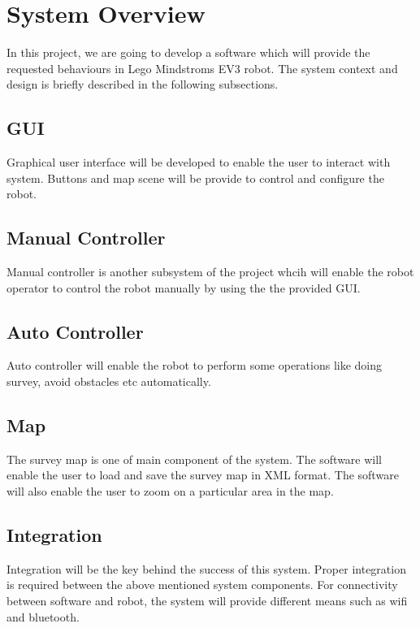 \section{System Overview}
In this project, we are going to develop a software which will provide the requested behaviours in Lego Mindstroms EV3 robot. The system context and design is briefly described in the following subsections.
\subsection{GUI}
Graphical user interface will be developed to enable the user to interact with system. Buttons and map scene will be provide to control and configure the robot.  
\subsection{Manual Controller}
Manual controller is another subsystem of the project whcih will enable the robot operator to control the robot manually by using the the provided GUI. 
\subsection{Auto Controller}
Auto controller will enable the robot to perform some operations like doing survey, avoid obstacles etc automatically. 
\subsection{Map}
The survey map is one of main component of the system. The software will enable the user to load and save the survey map in XML format. The software will also enable the user to zoom on a particular area in the map. 
\subsection{Integration}
Integration will be the key behind the success of this system. Proper integration is required between the above mentioned system components. For connectivity between software and robot, the system will provide different means such as wifi and bluetooth.  

